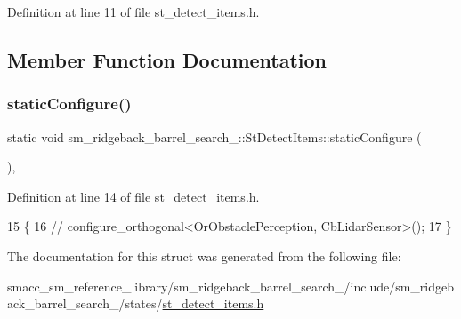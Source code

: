 Definition at line 11 of file st\+\_\+detect\+\_\+items.\+h.



\subsection{Member Function Documentation}
\mbox{\label{structsm__ridgeback__barrel__search__2_1_1StDetectItems_a4bcbe01aca1085a0d4d95b53b5d2c7d2}} 
\subsubsection{\texorpdfstring{static\+Configure()}{staticConfigure()}}
{\footnotesize\ttfamily static void sm\+\_\+ridgeback\+\_\+barrel\+\_\+search\+\_\+::\+St\+Detect\+Items\+::static\+Configure (\begin{DoxyParamCaption}{ }\end{DoxyParamCaption})\hspace{0.3cm}{\ttfamily [inline]}, {\ttfamily [static]}}



Definition at line 14 of file st\+\_\+detect\+\_\+items.\+h.


\begin{DoxyCode}
15   \{
16     \textcolor{comment}{//   configure\_orthogonal<OrObstaclePerception, CbLidarSensor>();}
17   \}
\end{DoxyCode}


The documentation for this struct was generated from the following file\+:\begin{DoxyCompactItemize}
\item 
smacc\+\_\+sm\+\_\+reference\+\_\+library/sm\+\_\+ridgeback\+\_\+barrel\+\_\+search\+\_/include/sm\+\_\+ridgeback\+\_\+barrel\+\_\+search\+\_/states/\hyperlink{sm__ridgeback__barrel__search__2_2include_2sm__ridgeback__barrel__search__2_2states_2st__detect__items_8h}{st\+\_\+detect\+\_\+items.\+h}\end{DoxyCompactItemize}
